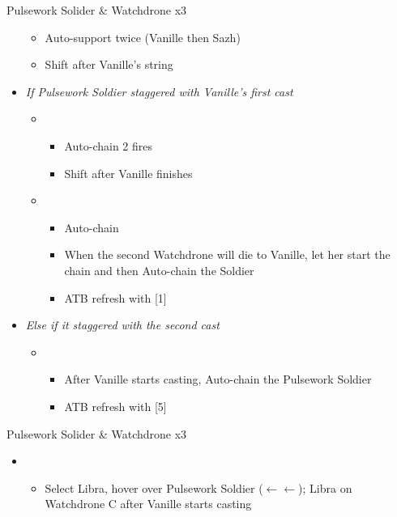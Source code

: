 \begin{paracol}{2}
\begin{battle}{Pulsework Solider \& Watchdrone x3}
\begin{itemize}
\begin{itemize}
				      \item Auto-support twice (Vanille then Sazh)
				      \item Shift after Vanille's string
			      \end{itemize}
			\item \textit{If Pulsework Soldier staggered with Vanille's first cast}
			      \begin{itemize}
				      \item \first
				            \begin{itemize}
					            \item Auto-chain 2 fires
					            \item Shift after Vanille finishes
				            \end{itemize}
				      \item \fifth
				            \begin{itemize}
					            \item Auto-chain
					            \item When the second Watchdrone will die to Vanille, let her start the chain and then Auto-chain the Soldier
					            \item ATB refresh with [1]
				            \end{itemize}
			      \end{itemize}
			\item \textit{Else if it staggered with the second cast}
			      \begin{itemize}
				      \item \first
				            \begin{itemize}
					            \item After Vanille starts casting, Auto-chain the Pulsework Soldier
					            \item ATB refresh with [5]
				            \end{itemize}
			      \end{itemize}
		\end{itemize}
	\end{battle}
	\switchcolumn
	\begin{battle}{Pulsework Solider \& Watchdrone x3}
		\begin{itemize}
			\item \fourth
			      \begin{itemize}
				      \item Select Libra, hover over Pulsework Soldier ($\leftarrow\leftarrow$); Libra on Watchdrone C after Vanille starts casting

\end{itemize}
\end{itemize}
\end{battle}
\end{paracol}
